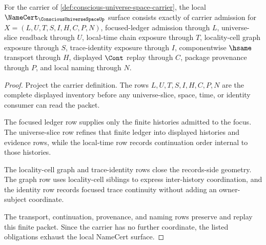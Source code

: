 \begin{theorem}
\label{thm:conscious-universe-space-namecert-obligations}
For the carrier of \autoref{def:conscious-universe-space-carrier}, the local $\NameCert_{\ConsciousUniverseSpaceUp}$ surface consists exactly of carrier admission for $X=(L,U,T,S,I,H,C,P,N)$, focused-ledger admission through $L$, universe-slice readback through $U$, local-time chain exposure through $T$, locality-cell graph exposure through $S$, trace-identity exposure through $I$, componentwise $\hsame$ transport through $H$, displayed $\Cont$ replay through $C$, package provenance through $P$, and local naming through $N$.
\end{theorem}
\begin{proof}
Project the carrier definition. The rows $L,U,T,S,I,H,C,P,N$ are the complete displayed inventory before any universe-slice, space, time, or identity consumer can read the packet.

The focused ledger row supplies only the finite histories admitted to the focus. The universe-slice row refines that finite ledger into displayed histories and evidence rows, while the local-time row records continuation order internal to those histories.

The locality-cell graph and trace-identity rows close the records-side geometry. The graph row uses locality-cell siblings to express inter-history coordination, and the identity row records focused trace continuity without adding an owner-subject coordinate.

The transport, continuation, provenance, and naming rows preserve and replay this finite packet. Since the carrier has no further coordinate, the listed obligations exhaust the local NameCert surface.
\end{proof}

